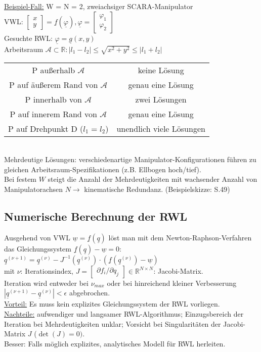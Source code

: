 \documentclass[a4paper,landscape,6pt]{article}
\newcommand{\ma}[1]{\ensuremath{\boldsymbol {#1}}}								%
\newcommand{\mat}[1]{\ensuremath{\begin{bmatrix} #1 \end{bmatrix}}}				%
\newcommand{\ul}[1]{\underline{#1}}
\begin{document}
\begin{multicols}{3}
\ul{Beispiel-Fall:} W = N = 2, zweiachsiger SCARA-Manipulator\\
VWL: $\mat{x\\y} = \ul f (\ul \varphi), \ul \varphi = \mat { \varphi_1 \\ \varphi_2}$\\
Gesuchte RWL: $\ul \varphi = \ul g (x,y)$\\
Arbeitsraum $\ma{\mathcal{A}} \subset \mathbb{R}: |l_1 - l_2| \le \sqrt{x^2 + y^2} \le |l_1 + l_2|$\\
\begin{tabular}{|c|c|}
	\hline
	P außerhalb $\ma{\mathcal{A}}$ & keine Lösung \\
	P auf äußerem Rand von $\ma{\mathcal{A}}$ & genau eine Lösung\\
	P innerhalb von $\ma{\mathcal{A}}$ & zwei Lösungen \\
	P auf innerem Rand von $\ma{\mathcal{A}}$ & genau eine Lösung \\
	P auf Drehpunkt D ($l_1 = l_2$) & unendlich viele Lösungen \\
	\hline
\end{tabular}\\

Mehrdeutige Lösungen: verschiedenartige Manipulator-Konfigurationen führen zu gleichen Arbeitsraum-Spezifikationen (z.B. Ellbogen hoch/tief).\\
Bei festem $W$ steigt die Anzahl der Mehrdeutigkeiten mit wachsender Anzahl von Manipulatorachsen $N \rightarrow$ kinematische Redundanz. (Beispielskizze: S.49)\\
\subsection*{Numerische Berechnung der RWL}
Ausgehend von VWL $\ul w = \ul f( \ul q)$ löst man mit dem Newton-Raphson-Verfahren das Gleichungssystem $\ul f(\ul q) - \ul w = 0$: $\boxed{\ul q ^{(\nu+1)} = \ul q^{(\nu)} - J^{-1}(\ul q^{(\nu)}) \cdot (\ul f(\ul q^{(\nu)}) - \ul w)}$\\
mit $\nu$: Iterationsindex, $J=\mat{\partial f_i / \partial q_j} \in \mathbb{R}^{N \times N}$: Jacobi-Matrix.\\
Iteration wird entweder bei $\nu_{max}$ oder bei hinreichend kleiner Verbesserung $|\ul q ^{(\nu+1)} - \ul q ^{(\nu)}| < \epsilon$ abgebrochen.\\
\ul{Vorteil:} Es muss kein explizites Gleichungssystem der RWL vorliegen.\\
\ul{Nachteile:} aufwendiger und langsamer RWL-Algorithmus; Einzugsbereich der Iteration bei Mehrdeutigkeiten unklar; Vorsicht bei Singularitäten der Jacobi-Matrix $J$ ($\det (J) = 0)$.\\
Besser: Falls möglich explizites, analytisches Modell für RWL herleiten.

\end{multicols}
\end{document}
